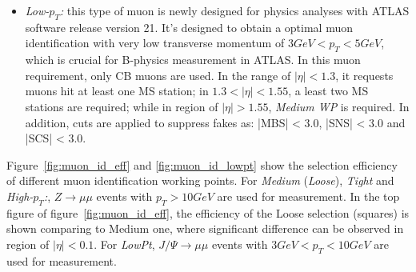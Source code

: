\begin{itemize}
	\item \textit{Low-$p_{T}$:} this type of muon is newly designed for physics analyses with ATLAS software release version 21. It's designed to obtain a optimal muon identification with very low transverse momentum of $3 GeV < p_{T} < 5 GeV$, which is crucial for B-physics measurement in ATLAS. 
	In this muon requirement, only CB muons are used. In the range of $|\eta| < 1.3$, it requests muons hit at least one MS station; in $1.3 < |\eta| < 1.55$, a least two MS stations are required; while in region of $|\eta| > 1.55$, \textit{Medium WP} is required. In addition, cuts are applied to suppress fakes as: |MBS| < 3.0, |SNS| < 3.0 and |SCS| < 3.0.
\end{itemize}

Figure~\ref{fig:muon_id_eff} and \ref{fig:muon_id_lowpt} show the selection efficiency of different muon identification working points. 
For \textit{Medium} (\textit{Loose}), \textit{Tight} and \textit{High-$p_{T}$:}, $Z \rightarrow \mu\mu$ events with $p_{T} > 10 GeV$ are used for measurement. 
In the top figure of figure~\ref{fig:muon_id_eff}, the efficiency of the Loose selection (squares) is shown comparing to Medium one, where significant difference can be observed in region of $|\eta| < 0.1$.
For \textit{LowPt}, $J/\Psi \rightarrow \mu\mu$ events with $3 GeV < p_{T} < 10 GeV$ are used for measurement.
